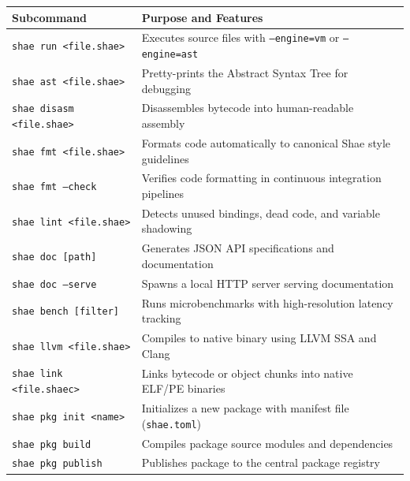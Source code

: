 \begin{longtable}{ll}
\toprule
\textbf{Subcommand} & \textbf{Purpose and Features} \\
\midrule
\endhead
\texttt{shae run <file.shae>} & Executes source files with \texttt{--engine=vm} or \texttt{--engine=ast} \\
\texttt{shae ast <file.shae>} & Pretty-prints the Abstract Syntax Tree for debugging \\
\texttt{shae disasm <file.shae>} & Disassembles bytecode into human-readable assembly \\
\texttt{shae fmt <file.shae>} & Formats code automatically to canonical Shae style guidelines \\
\texttt{shae fmt --check} & Verifies code formatting in continuous integration pipelines \\
\texttt{shae lint <file.shae>} & Detects unused bindings, dead code, and variable shadowing \\
\texttt{shae doc [path]} & Generates JSON API specifications and documentation \\
\texttt{shae doc --serve} & Spawns a local HTTP server serving documentation \\
\texttt{shae bench [filter]} & Runs microbenchmarks with high-resolution latency tracking \\
\texttt{shae llvm <file.shae>} & Compiles to native binary using LLVM SSA and Clang \\
\texttt{shae link <file.shaec>} & Links bytecode or object chunks into native ELF/PE binaries \\
\texttt{shae pkg init <name>} & Initializes a new package with manifest file (\texttt{shae.toml}) \\
\texttt{shae pkg build} & Compiles package source modules and dependencies \\
\texttt{shae pkg publish} & Publishes package to the central package registry \\
\bottomrule
\end{longtable}
